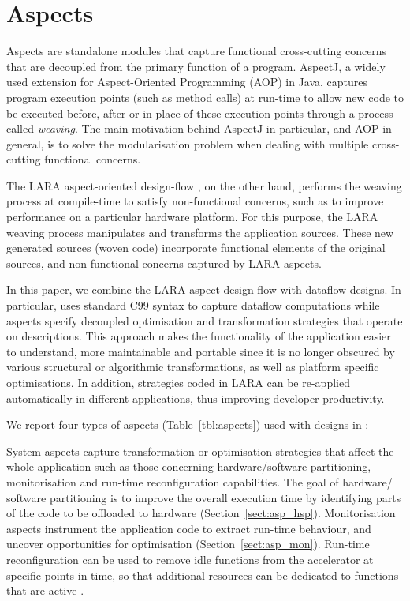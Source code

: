 \chapter{Aspects}
\label{sec:aspects}

Aspects are standalone modules that capture functional cross-cutting
concerns that are decoupled from the primary function of a
program. AspectJ\cite{Kiczales:2005:AP:1062455.1062640}, a widely
used extension for Aspect-Oriented Programming (AOP) in Java, captures
program execution points (such as method calls) at run-time to allow
new code to be executed before, after or in place of these execution
points through a process called \emph{weaving}. The main motivation
behind AspectJ in particular, and AOP in general, is to solve the
modularisation problem when dealing with multiple cross-cutting
functional concerns.

The LARA aspect-oriented
design-flow \cite{Cardoso:Carvalho:Cutinho:Luk:Nobre:Diniz:Petrov:2012},
on the other hand, performs the weaving process at compile-time to
satisfy non-functional concerns, such as to improve performance on a
particular hardware platform. For this purpose, the LARA weaving
process manipulates and transforms the application sources. These new
generated sources (woven code) incorporate functional elements of the
original sources, and non-functional concerns captured by LARA
aspects.

In this paper, we combine the LARA aspect design-flow with \FAST{}
dataflow designs. In particular, \FAST{} uses standard C99 syntax to
capture dataflow computations while aspects specify decoupled
optimisation and transformation strategies that operate on \FAST{}
descriptions. This approach makes the functionality of the application
easier to understand, more maintainable and portable since it is no
longer obscured by various structural or algorithmic transformations,
as well as platform specific optimisations. In addition, strategies
coded in LARA can be re-applied automatically in different
applications, thus improving developer productivity.

We report four types of aspects (Table~\ref{tbl:aspects}) used with
designs in \FAST{}:

\vspace*{1.2ex}
 System aspects capture transformation
or optimisation strategies that affect the whole application such as
those concerning hardware/software partitioning, monitorisation and
run-time reconfiguration capabilities. The goal of hardware/ software
partitioning is to improve the overall execution time by identifying
parts of the code to be offloaded to hardware
(Section~\ref{sect:asp_hsp}). Monitorisation aspects instrument the
application code to extract run-time behaviour, and uncover
opportunities for optimisation (Section~\ref{sect:asp_mon}).
Run-time reconfiguration can be used to remove idle functions
from the accelerator at specific points in time, so that
additional resources can be dedicated to functions that are
active \cite{Xinyu:Qiwei:Luk:Qiang:Pell:2012}.

